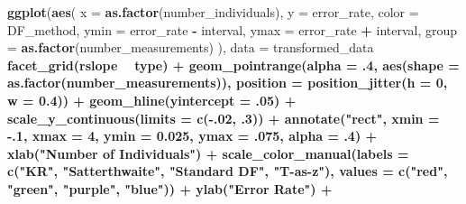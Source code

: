 \documentclass[12pt, twoside]{amherstthesis}
\newenvironment{Shaded}{\begin{snugshade}}{\end{snugshade}}
\newcommand{\DataTypeTok}[1]{\textcolor[rgb]{0.13,0.29,0.53}{#1}}
\newcommand{\DecValTok}[1]{\textcolor[rgb]{0.00,0.00,0.81}{#1}}
\newcommand{\FloatTok}[1]{\textcolor[rgb]{0.00,0.00,0.81}{#1}}
\newcommand{\KeywordTok}[1]{\textcolor[rgb]{0.13,0.29,0.53}{\textbf{#1}}}
\newcommand{\NormalTok}[1]{#1}
\newcommand{\OperatorTok}[1]{\textcolor[rgb]{0.81,0.36,0.00}{\textbf{#1}}}
\newcommand{\StringTok}[1]{\textcolor[rgb]{0.31,0.60,0.02}{#1}}
\begin{document}
\begin{Shaded}
\begin{Highlighting}[]
{{{{{{{{{{{\KeywordTok{ggplot}\NormalTok{(}\KeywordTok{aes}\NormalTok{(}
  \DataTypeTok{x =} \KeywordTok{as.factor}\NormalTok{(number_individuals), }\DataTypeTok{y =}\NormalTok{ error_rate, }\DataTypeTok{color =}\NormalTok{ DF_method,}
  \DataTypeTok{ymin =}\NormalTok{ error_rate }\OperatorTok{-}\StringTok{ }\NormalTok{interval, }\DataTypeTok{ymax =}\NormalTok{ error_rate }\OperatorTok{+}\StringTok{ }\NormalTok{interval,}
  \DataTypeTok{group =} \KeywordTok{as.factor}\NormalTok{(number_measurements)}
\NormalTok{), }\DataTypeTok{data =}\NormalTok{ transformed_data }\OperatorTok{%>%}\StringTok{ }\KeywordTok{filter}\NormalTok{(distribution }\OperatorTok{==}\StringTok{ "Lognormal"}\NormalTok{)) }\OperatorTok{+}
\StringTok{  }\KeywordTok{facet_grid}\NormalTok{(rslope }\OperatorTok{~}\StringTok{ }\NormalTok{type) }\OperatorTok{+}
\StringTok{  }\KeywordTok{geom_pointrange}\NormalTok{(}\DataTypeTok{alpha =} \FloatTok{.4}\NormalTok{, }\KeywordTok{aes}\NormalTok{(}\DataTypeTok{shape =} \KeywordTok{as.factor}\NormalTok{(number_measurements)), }
                  \DataTypeTok{position =} \KeywordTok{position_jitter}\NormalTok{(}\DataTypeTok{h =} \DecValTok{0}\NormalTok{, }\DataTypeTok{w =} \FloatTok{0.4}\NormalTok{)) }\OperatorTok{+}
\StringTok{  }\KeywordTok{geom_hline}\NormalTok{(}\DataTypeTok{yintercept =} \FloatTok{.05}\NormalTok{) }\OperatorTok{+}
\StringTok{  }\KeywordTok{scale_y_continuous}\NormalTok{(}\DataTypeTok{limits =} \KeywordTok{c}\NormalTok{(}\OperatorTok{-}\NormalTok{.}\DecValTok{02}\NormalTok{, }\FloatTok{.3}\NormalTok{)) }\OperatorTok{+}
\StringTok{  }\KeywordTok{annotate}\NormalTok{(}\StringTok{"rect"}\NormalTok{, }\DataTypeTok{xmin =} \FloatTok{-.1}\NormalTok{, }\DataTypeTok{xmax =} \DecValTok{4}\NormalTok{, }\DataTypeTok{ymin =} \FloatTok{0.025}\NormalTok{, }\DataTypeTok{ymax =} \FloatTok{.075}\NormalTok{, }
           \DataTypeTok{alpha =} \FloatTok{.4}\NormalTok{) }\OperatorTok{+}
\StringTok{  }\KeywordTok{xlab}\NormalTok{(}\StringTok{"Number of Individuals"}\NormalTok{) }\OperatorTok{+}
\StringTok{  }\KeywordTok{scale_color_manual}\NormalTok{(}\DataTypeTok{labels =} \KeywordTok{c}\NormalTok{(}\StringTok{"KR"}\NormalTok{, }\StringTok{"Satterthwaite"}\NormalTok{, }
                                \StringTok{"Standard DF"}\NormalTok{, }\StringTok{"T-as-z"}\NormalTok{), }
                     \DataTypeTok{values =} \KeywordTok{c}\NormalTok{(}\StringTok{"red"}\NormalTok{, }\StringTok{"green"}\NormalTok{, }\StringTok{"purple"}\NormalTok{, }\StringTok{"blue"}\NormalTok{)) }\OperatorTok{+}
\StringTok{  }\KeywordTok{ylab}\NormalTok{(}\StringTok{"Error Rate"}\NormalTok{) }\OperatorTok{+}
}}}}}}}}}}}}
\end{Highlighting}
\end{Shaded}
\end{document}
